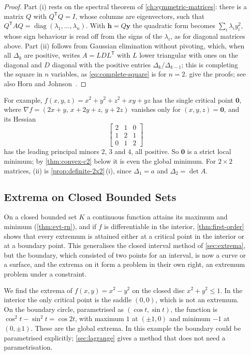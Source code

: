 \begin{proof}
Part (i) rests on the spectral theorem of \cref{ch:symmetric-matrices}: there is a matrix $Q$ with $Q^{\mathsf T}Q=I$, whose columns are eigenvectors, such that $Q^{\mathsf T}AQ=\operatorname{diag}(\lambda_1,\ldots,\lambda_n)$. With $\mathbf h=Q\mathbf y$ the quadratic form becomes $\sum_i\lambda_iy_i^2$, whose sign behaviour is read off from the signs of the $\lambda_i$, as for diagonal matrices above. Part (ii) follows from Gaussian elimination without pivoting, which, when all $\Delta_k$ are positive, writes $A=LDL^{\mathsf T}$ with $L$ lower triangular with ones on the diagonal and $D$ diagonal with the positive entries $\Delta_k/\Delta_{k-1}$; this is completing the square in $n$ variables, as \eqref{eq:complete-square} is for $n=2$.  give the proofs; see also Horn and Johnson~\cite[Sects.~4.1 and~7.2]{horn2013}.
\end{proof}

For example, $f(x,y,z)=x^2+y^2+z^2+xy+yz$ has the single critical point $\mathbf0$, where $\nabla f=(2x+y,\,x+2y+z,\,y+2z)$ vanishes only for $(x,y,z)=\mathbf0$, and its Hessian
\[
\begin{bmatrix}2&1&0\\1&2&1\\0&1&2\end{bmatrix}
\]
has the leading principal minors $2$, $3$ and $4$, all positive. So $\mathbf0$ is a strict local minimum; by \cref{thm:convex-c2} below it is even the global minimum. For $2\times2$ matrices, (ii) is \cref{prop:definite-2x2}\,(i), since $\Delta_1=a$ and $\Delta_2=\det A$.

\subsection{Extrema on Closed Bounded Sets}

On a closed bounded set $K$ a continuous function attains its maximum and minimum (\cref{thm:evt-rn}), and if $f$ is differentiable in the interior, \cref{thm:first-order} shows that every extremum is attained either at a critical point in the interior or at a boundary point. This generalises the closed interval method of \cref{sec:extrema}, but the boundary, which consisted of two points for an interval, is now a curve or a surface, and the extrema on it form a problem in their own right, an extremum problem under a constraint.

We find the extrema of $f(x,y)=x^2-y^2$ on the closed disc $x^2+y^2\le1$. In the interior the only critical point is the saddle $(0,0)$, which is not an extremum. On the boundary circle, parametrised as $(\cos t,\sin t)$, the function is $\cos^2t-\sin^2t=\cos2t$, with maximum $1$ at $(\pm1,0)$ and minimum $-1$ at $(0,\pm1)$. These are the global extrema. In this example the boundary could be parametrised explicitly; \cref{sec:lagrange} gives a method that does not need a parametrisation.

